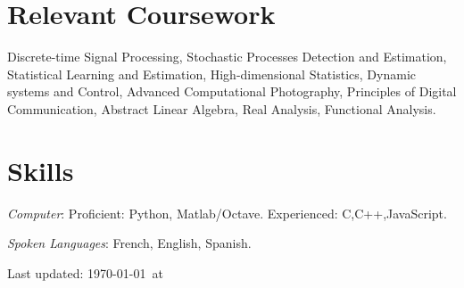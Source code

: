 \documentclass[12pt,letterpaper]{article}
\def\HCode#1{}
\renewenvironment{itemize}{
  \begin{list}{}{
    \setlength{\leftmargin}{1.5em}
    \setlength{\itemsep}{0.25em}
    \setlength{\parskip}{0pt}
    \setlength{\parsep}{0.25em}
  }
}{
  \end{list}
}
\begin{document}
\section*{Relevant Coursework}

Discrete-time Signal Processing, Stochastic Processes
Detection and Estimation, Statistical Learning and Estimation, High-dimensional Statistics,
Dynamic systems and Control, Advanced Computational Photography, Principles
of Digital Communication, Abstract Linear Algebra, Real Analysis, Functional
Analysis.



\HCode{<a name="journalpapers"></a>}
%




%

%
%
%

\section*{Skills}

\begin{itemize}
  \item \emph{Computer}: Proficient: Python, Matlab/Octave. Experienced: C,C++,JavaScript.
  \item \emph{Spoken Languages}: French, English, Spanish.
\end{itemize}




\vfill
\HCode{<center>}
\begin{center}
    \begin{small}
        Last updated: \today\ at \currenttime
    \end{small}
\end{center}
\HCode{</center>}



\HCode{</div>} %
\HCode{</div>} %
\HCode{</div>} %
\end{document}
